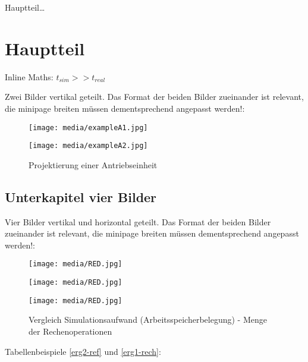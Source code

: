 \label{ch_creation}

Hauptteil\ldots

\section{Hauptteil}
Inline Maths: $t_{sim} >> t_{real}$

Zwei Bilder vertikal geteilt. Das Format der beiden Bilder zueinander ist relevant, die minipage breiten
müssen dementsprechend angepasst werden!:
\begin{figure}[h]
  \hfill
  \begin{minipage}[t]{0.65\textwidth}
    \texttt{[image: media/exampleA1.jpg]}
  \end{minipage}
  \hfill
  \begin{minipage}[t]{0.3\textwidth}
    \texttt{[image: media/exampleA2.jpg]}
  \end{minipage}
  \hfill
  \captionsetup{width=0.8\textwidth}
  \caption[Projektierung]{Projektierung einer Antriebseinheit}
  \label{antrieb1}
  \vspace{-0.4cm}
\end{figure}

\newpage

\subsection{Unterkapitel vier Bilder}

Vier Bilder vertikal und horizontal geteilt. Das Format der beiden Bilder zueinander ist relevant, die minipage breiten
müssen dementsprechend angepasst werden!:
\begin{figure}[h]
  \hfill
  \begin{minipage}[t]{0.49\textwidth}
    \texttt{[image: media/RED.jpg]}
  \end{minipage}
  \hfill
  \begin{minipage}[t]{0.49\textwidth}
    \texttt{[image: media/RED.jpg]}
  \end{minipage}
  \hfill

  \vspace{0.01\textwidth}

  \hfill
  \begin{minipage}[b]{0.49\textwidth}
    \texttt{[image: media/RED.jpg]}
  \end{minipage}
  \hfill
  \begin{minipage}[b]{0.49\textwidth}
  \end{minipage}
  \hfill

  \captionsetup{width=0.8\textwidth}
  \caption[Vergleich Arbeitsspeicherbelegung - Rechenoperationen]{Vergleich Simulationsaufwand (Arbeitsspeicherbelegung) - Menge der Rechenoperationen}
  \label{vergleich1dot5}
  \vspace{-0.4cm}
\end{figure}
Tabellenbeispiele \ref{erg2-ref} und \ref{erg1-rech}:

